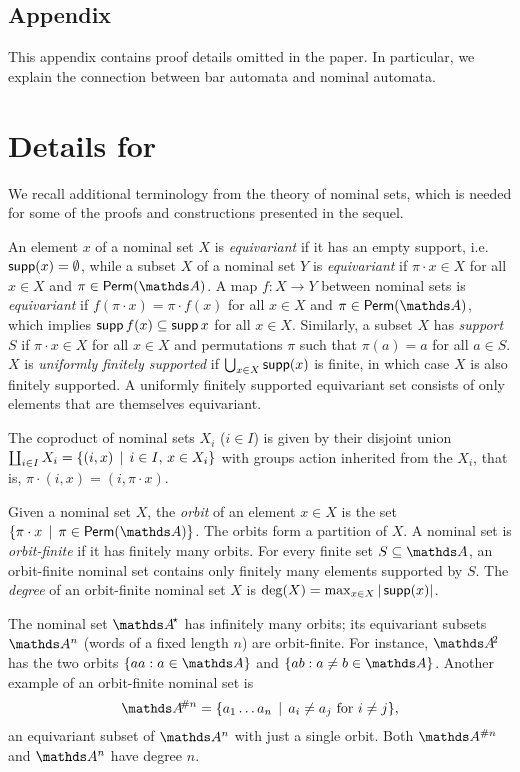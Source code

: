 \documentclass[a4paper,UKenglish,cleveref,autoref,thm-restate,numberwithinsect,final]{lipics-v2021}
\begin{document}
    


\appendix
\subsection*{Appendix}
This appendix contains proof details omitted in the paper. In particular, we explain the connection between bar automata and nominal automata.

    \section{Details for~}\label{app:EquivModels}
    
We recall additional terminology from the theory of nominal sets, which is needed for some of the proofs and constructions presented in the sequel.

    An element $x$ of a nominal set $X$ is \emph{equivariant} if it has an empty support, i.e.~$\operatorname{\mathsf{supp}}(x) = \emptyset$, while a subset $X$ of a nominal set $Y$ is \emph{equivariant} if $\pi\cdot x\in X$ for all $x\in X$ and $\pi\in\Perm(\names)$.
    A map $f\colon X \to Y$ between nominal sets is \emph{equivariant} if $f(\pi \cdot x) = \pi \cdot f(x)$ for all $x \in X$ and $\pi \in \Perm(\names)$, which implies $\operatorname{\mathsf{supp}} f(x) \subseteq \operatorname{\mathsf{supp}} x$ for all $x \in X$.
    Similarly, a subset $X$ has \emph{support} $S$ if $\pi \cdot x \in X$ for all $x \in X$ and permutations $\pi$ such that $\pi(a) = a$ for all $a \in S$.
    $X$ is \emph{uniformly finitely supported} if $\bigcup_{x \in X} \operatorname{\mathsf{supp}}(x)$ is finite, in which case $X$ is also finitely supported. A uniformly finitely supported equivariant set consists of only elements that are themselves equivariant.

    The coproduct of nominal sets $X_i$ ($i\in I$) is given by their disjoint union $\coprod_{i\in I} X_i = \{(i,x)\,\mid\,i\in I,\, x\in X_i\}$ with groups action inherited from the $X_i$, that is, $\pi\cdot (i,x)=(i,\pi\cdot x)$.

    Given a nominal set $X$, the \emph{orbit} of an element $x\in X$ is the set  $\setw{\pi\cdot x}{\pi \in \Perm(\names)}$. The orbits form a partition of $X$.
    A nominal set is \emph{orbit-finite} if it has finitely many orbits. For every finite set $S\seq\names$, an orbit-finite nominal set contains only finitely many elements supported by $S$. The \emph{degree} of an orbit-finite nominal set $X$ is  $\deg(X) = \max_{x\in X} |\operatorname{\mathsf{supp}}(x)|$. 

    \begin{expl}
     The nominal set $\Ats$ has infinitely
        many orbits; its equivariant subsets $\names^n$ (words of a fixed length $n$) are orbit-finite. For instance,
        $\names\!^2$ has the two orbits $\{aa: a\in \names\}$ and $\{ab: a\neq b\in \names\}$.
        Another example of an orbit-finite nominal set is \[\names\!^{\#n} = \setw{a_1\ldots a_n}{a_i\neq a_j
        \text{ for $i\neq j$}},\]
an equivariant subset of $\names^n$ with just a single orbit.
        Both $\names^{\# n}$ and $\names^n$ have degree $n$.
    \end{expl}
\end{document}
